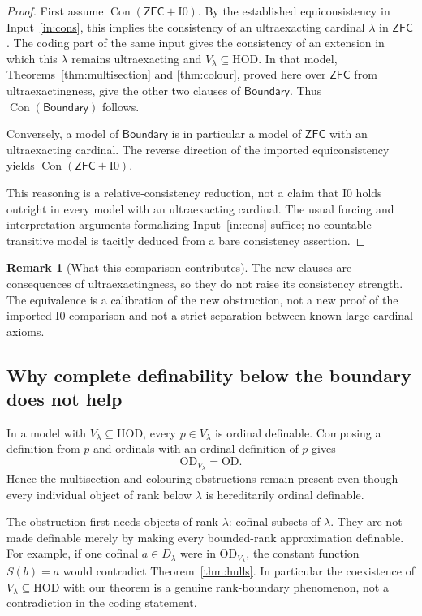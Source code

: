 \documentclass[11pt,letterpaper]{article}
\theoremstyle{definition}
\newtheorem{remark}[definition]{Remark}
\numberwithin{equation}{section}
\newcommand{\ZFC}{\mathsf{ZFC}}
\newcommand{\HOD}{\mathrm{HOD}}
\newcommand{\OD}{\mathrm{OD}}
\newcommand{\Con}{\operatorname{Con}}
\newcommand{\Izero}{\mathrm{I0}}
\newcommand{\Boundary}{\mathsf{Boundary}}
\begin{document}
\begin{proof}
First assume $\Con(\ZFC+\Izero)$. By the established equiconsistency in Input~\ref{in:cons}, this implies the consistency of an ultraexacting cardinal $\lambda$ in $\ZFC$. The coding part of the same input gives the consistency of an extension in which this $\lambda$ remains ultraexacting and $V_\lambda\subseteq\HOD$. In that model, Theorems~\ref{thm:multisection} and \ref{thm:colour}, proved here over $\ZFC$ from ultraexactingness, give the other two clauses of $\Boundary$. Thus $\Con(\Boundary)$ follows.

Conversely, a model of $\Boundary$ is in particular a model of $\ZFC$ with an ultraexacting cardinal. The reverse direction of the imported equiconsistency yields $\Con(\ZFC+\Izero)$.

This reasoning is a relative-consistency reduction, not a claim that $\Izero$ holds outright in every model with an ultraexacting cardinal. The usual forcing and interpretation arguments formalizing Input~\ref{in:cons} suffice; no countable transitive model is tacitly deduced from a bare consistency assertion.
\end{proof}

\begin{remark}[What this comparison contributes]
The new clauses are consequences of ultraexactingness, so they do not raise its consistency strength. The equivalence is a calibration of the new obstruction, not a new proof of the imported $\Izero$ comparison and not a strict separation between known large-cardinal axioms.
\end{remark}

\subsection{Why complete definability below the boundary does not help}

In a model with $V_\lambda\subseteq\HOD$, every $p\in V_\lambda$ is ordinal definable. Composing a definition from $p$ and ordinals with an ordinal definition of $p$ gives
\[
 \OD_{V_\lambda}=\OD.
\]
Hence the multisection and colouring obstructions remain present even though every individual object of rank below $\lambda$ is hereditarily ordinal definable.

The obstruction first needs objects of rank $\lambda$: cofinal subsets of $\lambda$. They are not made definable merely by making every bounded-rank approximation definable. For example, if one cofinal $a\in D_\lambda$ were in $\OD_{V_\lambda}$, the constant function $S(b)=a$ would contradict Theorem~\ref{thm:hulls}. In particular the coexistence of $V_\lambda\subseteq\HOD$ with our theorem is a genuine rank-boundary phenomenon, not a contradiction in the coding statement.
\end{document}
